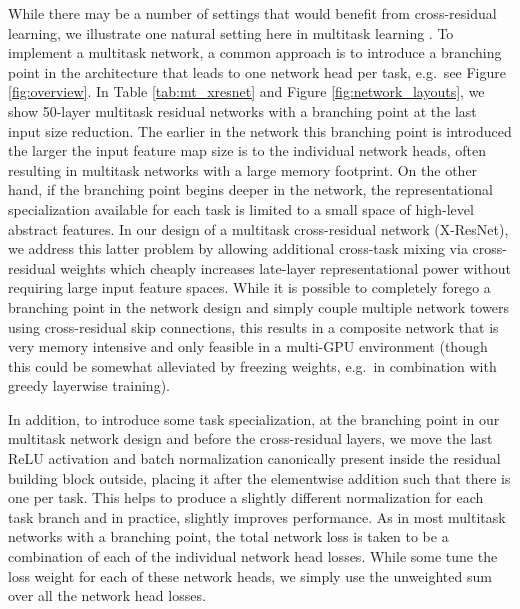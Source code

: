 \documentclass{sig-alternate-05-2015}
\begin{document}
While there may be a number of settings that would benefit from cross-residual learning, we illustrate one natural setting here in multitask learning \cite{caruana_1997}.
To implement a multitask network, a common approach \cite{collobert_2008,ghifary_2015,liu_2015,ramsundar_2015} is to introduce a branching point in the architecture that leads to one network head per task, e.g.~see Figure \ref{fig:overview}.
In Table \ref{tab:mt_xresnet} and Figure \ref{fig:network_layouts}, we show 50-layer multitask residual networks with a branching point at the last input size reduction.
The earlier in the network this branching point is introduced the larger the input feature map size is to the individual network heads, often resulting in multitask networks with a large memory footprint.
On the other hand, if the branching point begins deeper in the network, the representational specialization available for each task is limited to a small space of high-level abstract features.
In our design of a multitask cross-residual network (X-ResNet), we address this latter problem by allowing additional cross-task mixing via cross-residual weights which cheaply increases late-layer representational power without requiring large input feature spaces.
While it is possible to completely forego a branching point in the network design and simply couple multiple network towers using cross-residual skip connections, this results in a composite network that is very memory intensive and only feasible in a multi-GPU environment (though this could be somewhat alleviated by freezing weights, e.g.~in combination with greedy layerwise training).

In addition, to introduce some task specialization, at the branching point in our multitask network design and before the cross-residual layers, we move the last ReLU activation and batch normalization canonically present inside the residual building block outside, placing it after the elementwise addition such that there is one per task.
This helps to produce a slightly different normalization for each task branch and in practice, slightly improves performance.
As in most multitask networks with a branching point, the total network loss is taken to be a combination of each of the individual network head losses.
While some tune the loss weight for each of these network heads, we simply use the unweighted sum over all the network head losses.
\end{document}

